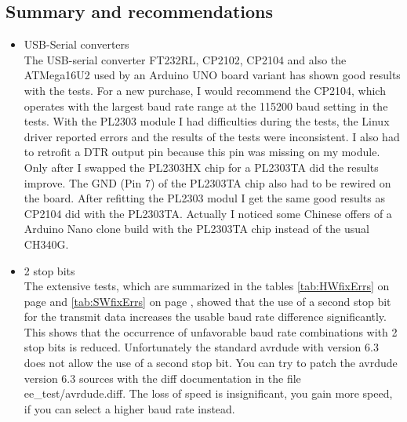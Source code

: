 \subsection{Summary and recommendations}
\begin{itemize}

\item{USB-Serial converters} \\
The USB-serial converter FT232RL, CP2102, CP2104 and also the ATMega16U2 used by an Arduino UNO board variant 
has shown good results with the tests.
For a new purchase, I would recommend the CP2104, which operates with the largest baud rate range
at the 115200 baud setting in the tests.
With the PL2303 module I had difficulties during the tests, the Linux driver reported errors and
the results of the tests were inconsistent.
I also had to retrofit a DTR output pin because this pin was missing on my module.
Only after I swapped the PL2303HX chip for a PL2303TA did the results improve.
The GND (Pin 7) of the PL2303TA chip also had to be rewired on the board.
After refitting the PL2303 modul I get the same good results as CP2104 did with the PL2303TA.
Actually I noticed some Chinese offers of a Arduino Nano clone build with the PL2303TA chip instead of the usual CH340G.

\item{2 stop bits} \\
The extensive tests, which are summarized in the tables \ref{tab:HWfixErrs} on page \pageref{tab:HWfixErrs} and 
\ref{tab:SWfixErrs} on page \pageref{tab:SWfixErrs}, showed that the use of a second stop bit for the transmit data 
increases the usable baud rate difference significantly.
This shows that the occurrence of unfavorable baud rate combinations with 2 stop bits is reduced.
Unfortunately the standard avrdude with version 6.3 does not allow the use of a second stop bit.
You can try to patch the avrdude version 6.3 sources with the diff documentation in the
file ee\_test/avrdude.diff.
The loss of speed is insignificant, you gain more speed, if you can select a higher baud rate instead.


\end{itemize}

